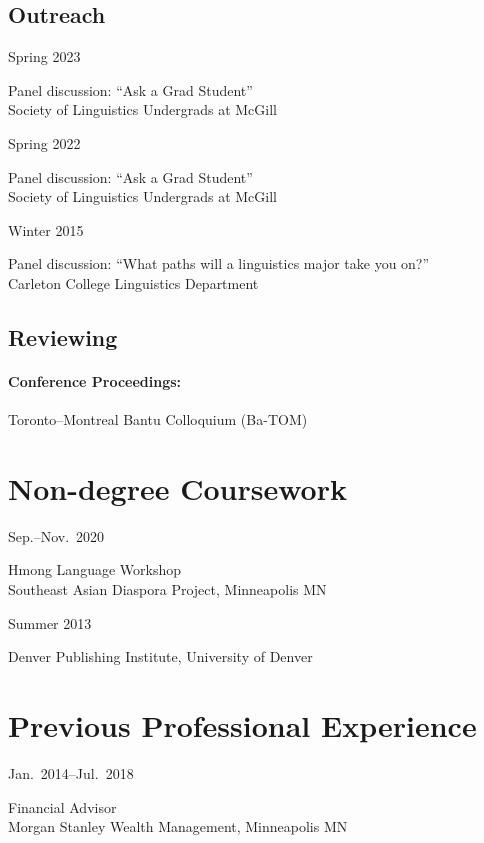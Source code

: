 \documentclass[11pt,oneside,DIV=9,parskip=off]{scrarticle} %
\newlength{\leftcolwidth}
\newlength{\rightcolwidth}
\newlength{\spacingbefore}
\newlength{\spacingafter}
\newcommand{\mytwocol}[2]{%
	\vspace{\spacingbefore}%
	\begin{minipage}[t]{\leftcolwidth}%
		\strut#1%
	\end{minipage}%
	\begin{minipage}[t]{\rightcolwidth}%
		\strut#2%
	\end{minipage}%
	\vspace{\spacingafter}\par%
	}
\newcommand{\cvline}[2]{%
	\mytwocol{#1}{#2}%
	}
\begin{document}
\subsection{Outreach}
\cvline{Spring 2023}{Panel discussion: ``Ask a Grad Student''\\Society of Linguistics Undergrads at McGill}
\cvline{Spring 2022}{Panel discussion: ``Ask a Grad Student''\\Society of Linguistics Undergrads at McGill}
\cvline{Winter 2015}{Panel discussion: ``What paths will a linguistics major take you on?''\\Carleton College Linguistics Department}

\subsection{Reviewing}
\paragraph{Conference Proceedings:} Toronto–Montreal Bantu Colloquium (Ba-TOM)

\section{Non-degree Coursework}
\cvline{Sep.--Nov.\ 2020}{Hmong Language Workshop\\Southeast Asian Diaspora Project, Minneapolis MN}
\cvline{Summer 2013}{Denver Publishing Institute, University of Denver}

\section{Previous Professional Experience}
\cvline{Jan.\ 2014--Jul.\ 2018}{Financial Advisor\\Morgan Stanley Wealth Management, Minneapolis MN}


\end{document}
